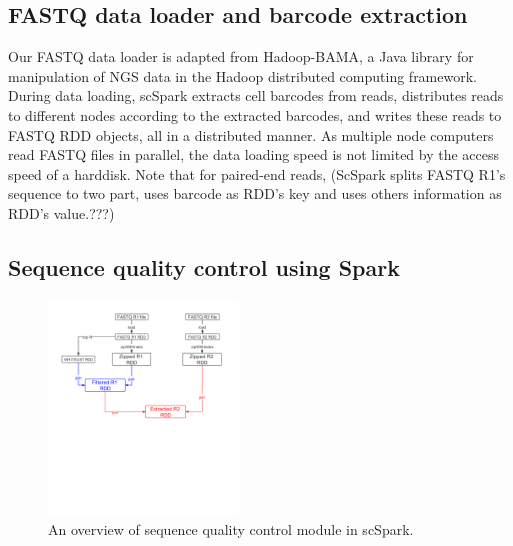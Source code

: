 \documentclass[conference]{IEEEtran}
\begin{document}

\subsection{FASTQ data loader and barcode extraction}

Our FASTQ data loader is adapted from Hadoop-BAMA\cite{hadoopBAM}, a Java library for manipulation of NGS data in the Hadoop distributed computing framework. 
During data loading, scSpark extracts cell barcodes from reads, distributes reads to different nodes according to the extracted barcodes, and writes these reads to FASTQ RDD objects, all in a distributed manner. 
As multiple node computers read FASTQ files in parallel, the data loading speed is not limited by the access speed of a harddisk. 
Note that for paired-end reads, (ScSpark splits FASTQ R1's sequence to two part, uses barcode as RDD's key and uses others information as RDD's value.???)

\subsection{Sequence quality control using Spark}
\begin{figure}
	\includegraphics[width=0.45\textwidth]{Fig1.pdf}
	\caption{An overview of sequence quality control module in scSpark.} \label{fig1}
\end{figure}
\end{document}

